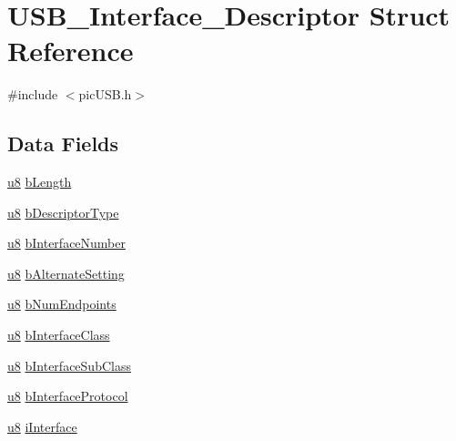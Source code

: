 \hypertarget{struct_u_s_b___interface___descriptor}{\section{U\-S\-B\-\_\-\-Interface\-\_\-\-Descriptor Struct Reference}
\label{struct_u_s_b___interface___descriptor}
}


{\ttfamily \#include $<$pic\-U\-S\-B.\-h$>$}

\subsection*{Data Fields}
\begin{DoxyCompactItemize}
\item 
\hyperlink{p8_2pinguino_2core_2typedef_8h_aed742c436da53c1080638ce6ef7d13de}{u8} \hyperlink{struct_u_s_b___interface___descriptor_a904ce9aea3e1db94a9a1ec5a0a22b65d}{b\-Length}
\item 
\hyperlink{p8_2pinguino_2core_2typedef_8h_aed742c436da53c1080638ce6ef7d13de}{u8} \hyperlink{struct_u_s_b___interface___descriptor_af6d6c7e334878414c973fc10e54cfb4e}{b\-Descriptor\-Type}
\item 
\hyperlink{p8_2pinguino_2core_2typedef_8h_aed742c436da53c1080638ce6ef7d13de}{u8} \hyperlink{struct_u_s_b___interface___descriptor_a1657e902c29e8c47402de2b39a576073}{b\-Interface\-Number}
\item 
\hyperlink{p8_2pinguino_2core_2typedef_8h_aed742c436da53c1080638ce6ef7d13de}{u8} \hyperlink{struct_u_s_b___interface___descriptor_ab7c4c36aed976d99c515a3373faecf4e}{b\-Alternate\-Setting}
\item 
\hyperlink{p8_2pinguino_2core_2typedef_8h_aed742c436da53c1080638ce6ef7d13de}{u8} \hyperlink{struct_u_s_b___interface___descriptor_a9a9163a4960fa710b2d655b8496b29ed}{b\-Num\-Endpoints}
\item 
\hyperlink{p8_2pinguino_2core_2typedef_8h_aed742c436da53c1080638ce6ef7d13de}{u8} \hyperlink{struct_u_s_b___interface___descriptor_a37040f8cc1429b370a6c7878d518dba0}{b\-Interface\-Class}
\item 
\hyperlink{p8_2pinguino_2core_2typedef_8h_aed742c436da53c1080638ce6ef7d13de}{u8} \hyperlink{struct_u_s_b___interface___descriptor_a441001119777ee7afef8c896683e3fdd}{b\-Interface\-Sub\-Class}
\item 
\hyperlink{p8_2pinguino_2core_2typedef_8h_aed742c436da53c1080638ce6ef7d13de}{u8} \hyperlink{struct_u_s_b___interface___descriptor_a81994bd2adcbe7db3a8fc28d433158de}{b\-Interface\-Protocol}
\item 
\hyperlink{p8_2pinguino_2core_2typedef_8h_aed742c436da53c1080638ce6ef7d13de}{u8} \hyperlink{struct_u_s_b___interface___descriptor_a08ba0e1160648c2e45d24d1f00484466}{i\-Interface}
\end{DoxyCompactItemize}


